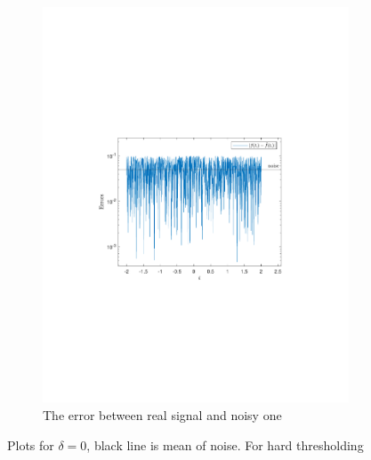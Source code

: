 \documentclass[a4paper]{article}
\begin{document}
\begin{figure}[H]
\begin{subfigure}{0.49\textwidth}
		\includegraphics[trim={4cm 8cm 4cm 8cm},clip,width=1\textwidth]{Images/Delta=0.pdf}
		\caption{The error between real signal and noisy one}
		\label{sub:ErrorD=0}
	\end{subfigure}
	\caption{Plots for $\delta = 0$, black line is mean of noise. For hard thresholding}
	\label{fig:Delta=0}
\end{figure}
\end{document}
